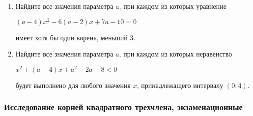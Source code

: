 \documentclass[12pt]{article}
\begin{document}
\begin{enumerate}[start=1,label={\itshape\bfseries \arabic*.}]
    \item Найдите все значения параметра $a$, при каждом из которых уравнение \begin{center} $ (a - 4)x^2 - 6(a - 2)x + 7a - 10 = 0$\end{center} имеет хотя бы один корень, меньший 3.
    \item Найдите все значения параметра $a$, при каждом из которых неравенство \begin{center}$x^2 + (a - 4)x + a^2 -2a - 8 < 0$\end{center} будет выполнено для любого значения $x$, принадлежащего интервалу $(0; 4)$.
\end{enumerate}
\subsubsection{Исследование корней квадратного трехчлена, экзаменационные}
\end{document}
